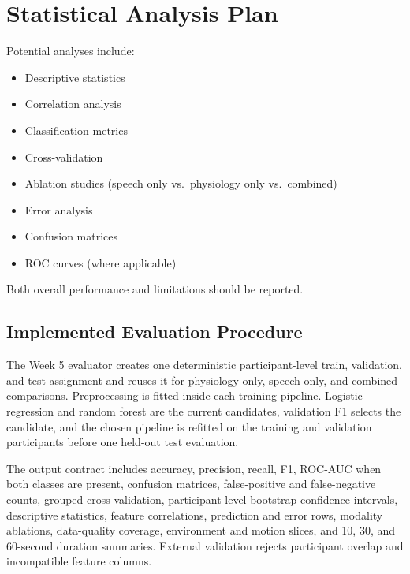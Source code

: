 \section{Statistical Analysis Plan}
\label{sec:statistical-analysis-plan}

Potential analyses include:
\begin{itemize}
    \item Descriptive statistics
    \item Correlation analysis
    \item Classification metrics
    \item Cross-validation
    \item Ablation studies (speech only vs.\ physiology only vs.\ combined)
    \item Error analysis
    \item Confusion matrices
    \item ROC curves (where applicable)
\end{itemize}

\begin{observationbox}
Both overall performance and limitations should be reported.
\end{observationbox}

\subsection{Implemented Evaluation Procedure}
\label{sec:implemented-evaluation-procedure}

The Week 5 evaluator creates one deterministic participant-level train, validation, and test assignment and reuses it for physiology-only, speech-only, and combined comparisons. Preprocessing is fitted inside each training pipeline. Logistic regression and random forest are the current candidates, validation F1 selects the candidate, and the chosen pipeline is refitted on the training and validation participants before one held-out test evaluation.

The output contract includes accuracy, precision, recall, F1, ROC-AUC when both classes are present, confusion matrices, false-positive and false-negative counts, grouped cross-validation, participant-level bootstrap confidence intervals, descriptive statistics, feature correlations, prediction and error rows, modality ablations, data-quality coverage, environment and motion slices, and 10, 30, and 60-second duration summaries. External validation rejects participant overlap and incompatible feature columns.

